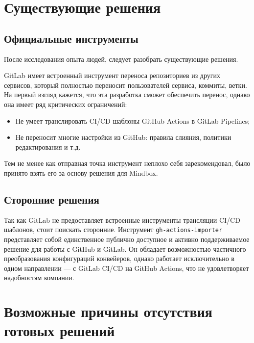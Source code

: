 \section{Существующие решения}\label{sec:existing-solutions}
\subsection{Официальные инструменты} \label{subsec:official-migration-instruments}
После исследования опыта людей, следует разобрать существующие решения.

GitLab имеет встроенный инструмент переноса репозиториев из других сервисов\cite{official-gl-migrator}, который полностью переносит пользователей сервиса, коммиты, ветки.
На первый взгляд кажется, что эта разработка сможет обеспечить перенос, однако она имеет ряд критических ограничений:
\begin{itemize}
  \item Не умеет транслировать CI/CD шаблоны GitHub Actions в GitLab Pipelines;
  \item Не переносит многие настройки из GitHub: правила слияния, политики редактирования и т.д.
\end{itemize}
Тем не менее как отправная точка инструмент неплохо себя зарекомендовал, было принято взять его за основу решения для Mindbox.

\subsection{Сторонние решения} \label{subsec:third-party-migration-instruments}
Так как GitLab не предоставляет встроенные инструменты трансляции CI/CD шаблонов, стоит поискать сторонние.
Инструмент \texttt{gh-actions-importer}\cite{gh-actions-importer} представляет собой единственное публично доступное и активно поддерживаемое решение для работы с GitHub и GitLab.
Он обладает возможностью частичного преобразования конфигураций конвейеров, однако работает исключительно в одном направлении — с GitLab CI/CD на GitHub Actions,
что не удовлетворяет надобностям компании.

\section{Возможные причины отсутствия готовых решений} \label{sec:instrument-absence}

